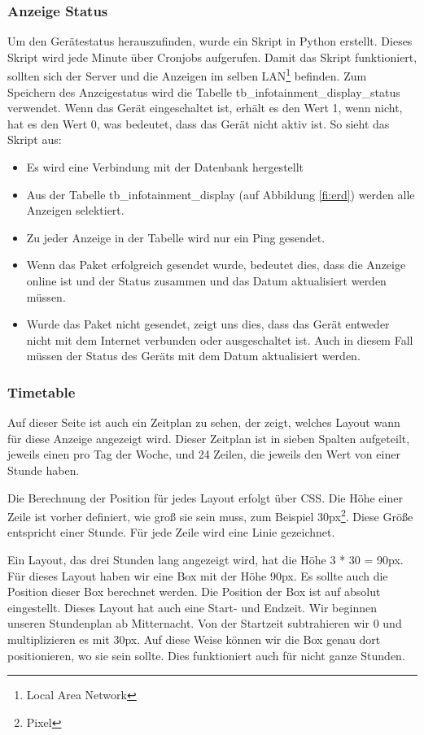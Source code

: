 \subsubsection{Anzeige Status}
Um den Gerätestatus herauszufinden, wurde ein Skript in Python erstellt. Dieses Skript wird jede Minute über Cronjobs aufgerufen. Damit das Skript funktioniert, sollten sich der Server und die Anzeigen im selben LAN\footnote{Local Area Network} befinden. Zum Speichern des Anzeigestatus wird die Tabelle tb\_infotainment\_display\_status verwendet. Wenn das Gerät eingeschaltet ist, erhält es den Wert 1, wenn nicht, hat es den Wert 0, was bedeutet, dass das Gerät nicht aktiv ist. So sieht das Skript aus:
\begin{itemize}
	\item Es wird eine Verbindung mit der Datenbank hergestellt
	\item Aus der Tabelle tb\_infotainment\_display (auf Abbildung \ref{fi:erd}) werden alle Anzeigen selektiert.
	\item Zu jeder Anzeige in der Tabelle wird nur ein Ping gesendet.
	\item Wenn das Paket erfolgreich gesendet wurde, bedeutet dies, dass die Anzeige online ist und der Status zusammen und das Datum aktualisiert werden müssen. 
	\item Wurde das Paket nicht gesendet, zeigt uns dies, dass das Gerät entweder nicht mit dem Internet verbunden oder ausgeschaltet ist. Auch in diesem Fall müssen der Status des Geräts mit dem Datum aktualisiert werden.
\end{itemize}


\subsubsection{Timetable}
Auf dieser Seite ist auch ein Zeitplan zu sehen, der zeigt, welches Layout wann für diese Anzeige angezeigt wird. Dieser Zeitplan ist in sieben Spalten aufgeteilt, jeweils einen pro Tag der Woche, und 24 Zeilen, die jeweils den Wert von einer Stunde haben.

Die Berechnung der Position für jedes Layout erfolgt über CSS. Die Höhe einer Zeile ist vorher definiert, wie groß sie sein muss, zum Beispiel 30px\footnote{Pixel}. Diese Größe entspricht einer Stunde. Für jede Zeile wird eine Linie gezeichnet. 

Ein Layout, das drei Stunden lang angezeigt wird, hat die Höhe 3 * 30 = 90px. Für dieses Layout haben wir eine Box mit der Höhe 90px. Es sollte auch die Position dieser Box berechnet werden. Die Position der Box ist auf absolut eingestellt. Dieses Layout hat auch eine Start- und Endzeit. Wir beginnen unseren Stundenplan ab Mitternacht. Von der Startzeit subtrahieren wir 0 und multiplizieren es mit 30px. Auf diese Weise können wir die Box genau dort positionieren, wo sie sein sollte. Dies funktioniert auch für nicht ganze Stunden.

